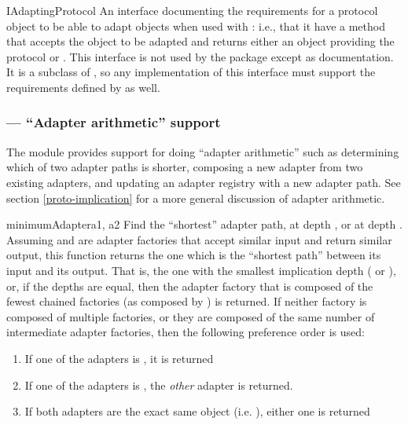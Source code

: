 \begin{verbatim%
}
\begin{verbatim%
}
\begin{verbatim%
}
\begin{verbatim%
}
\begin{verbatim%
}
\begin{verbatim%
}
\begin{classdesc*}{IAdaptingProtocol}
An interface documenting the requirements for a protocol object to be able to
adapt objects when used with : i.e., that it have a
 method that accepts the object to be adapted and returns
either an object providing the protocol or .  This interface is
not used by the  package except as documentation.  It is a
subclass of , so any implementation of this interface must
support the requirements defined by  as well.
\end{classdesc*}















\newpage
\subsubsection{ --- ``Adapter arithmetic'' support \label{protocol-adapters-module}}

The  module provides support for doing ``adapter
arithmetic'' such as determining which of two adapter paths is shorter,
composing a new adapter from two existing adapters, and updating an adapter
registry with a new adapter path.  See section \ref{proto-implication} for a
more general discussion of adapter arithmetic.

\begin{funcdesc}{minimumAdapter}{a1, a2 }
Find the ``shortest'' adapter path,  at depth , or  at
depth .  Assuming  and  are adapter factories that
accept similar input and return similar output, this function returns the one
which is the ``shortest path'' between its input and its output.  That is, the
one with the smallest implication depth ( or ), or, if the
depths are equal, then the adapter factory that is composed of the fewest
chained factories (as composed by ) is returned.
If neither factory is composed of multiple factories, or they are composed of
the same number of intermediate adapter factories, then the following
preference order is used:

\begin{enumerate}
\item If one of the adapters is , it is returned
\item If one of the adapters is , the \emph{other}
adapter is returned.
\item If both adapters are the exact same object (i.e. ), either
one is returned
\end{enumerate}


\end{funcdesc}
\end{verbatim%
}
\end{verbatim%
}
\end{verbatim%
}
\end{verbatim%
}
\end{verbatim%
}
\end{verbatim%
}
